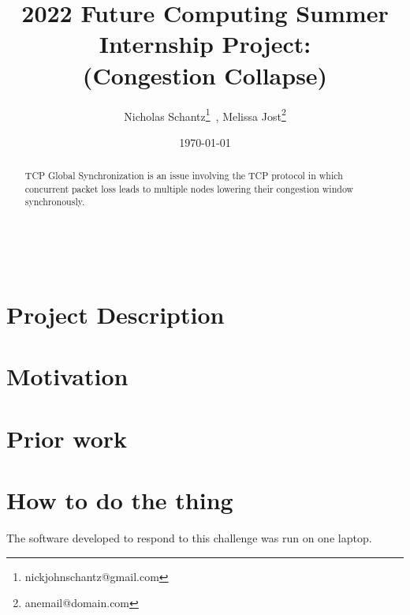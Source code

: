 \documentclass{article}
\begin{document}
    \begin{minipage}[h]{\textwidth}
        \title{2022 Future Computing Summer Internship Project:\\(Congestion Collapse)}
        \author{Nicholas Schantz\footnote{nickjohnschantz@gmail.com}\ , 
        Melissa Jost\footnote{anemail@domain.com}}
        \date{\today}
            \maketitle
        \begin{abstract}
            TCP Global Synchronization is an issue involving the TCP protocol in which concurrent packet loss leads to multiple nodes lowering their congestion window synchronously.
        \end{abstract}
    \end{minipage}

\ \\


\section{Project Description} %



\section{Motivation} %



\section{Prior work} %


\section{How to do the thing}

The software developed to respond to this challenge was run on one laptop.
\end{document}
